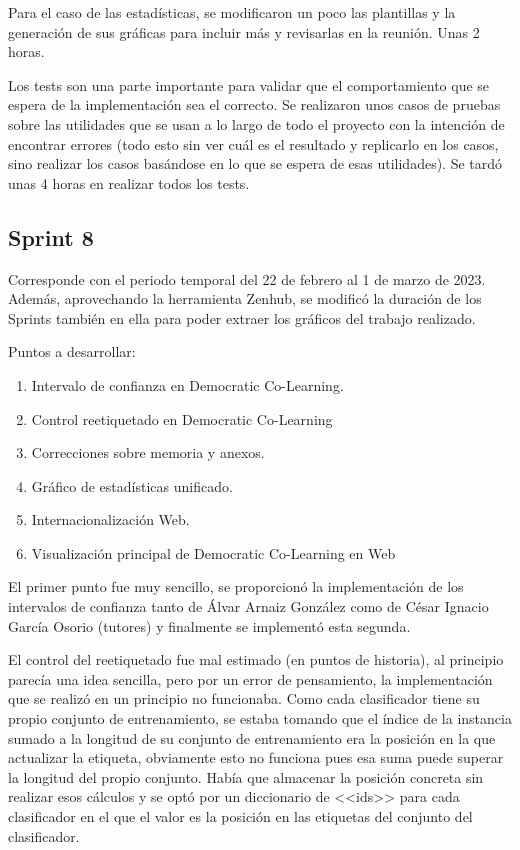 Para el caso de las estadísticas, se modificaron un poco las plantillas y la
generación de sus gráficas para incluir más y revisarlas en la reunión. Unas 2
horas.

Los tests son una parte importante para validar que el comportamiento que se
espera de la implementación sea el correcto. Se realizaron unos casos de pruebas
sobre las utilidades que se usan a lo largo de todo el proyecto con la intención
de encontrar errores (todo esto sin ver cuál es el resultado y replicarlo en los
casos, sino realizar los casos basándose en lo que se espera de esas
utilidades). Se tardó unas 4 horas en realizar todos los tests.

\subsection{Sprint 8}
Corresponde con el periodo temporal del 22 de febrero al 1 de marzo de 2023.
Además, aprovechando la herramienta Zenhub, se modificó la duración de los
Sprints también en ella para poder extraer los gráficos del trabajo realizado.

Puntos a desarrollar:
\begin{enumerate}
    \item Intervalo de confianza en Democratic Co-Learning.
    \item Control reetiquetado en Democratic Co-Learning
    \item Correcciones sobre memoria y anexos.
    \item Gráfico de estadísticas unificado.
    \item Internacionalización Web.
    \item Visualización principal de Democratic Co-Learning en Web
\end{enumerate}

El primer punto fue muy sencillo, se proporcionó la implementación de los
intervalos de confianza tanto de Álvar Arnaiz González como de César Ignacio
García Osorio (tutores) y finalmente se implementó esta segunda.

El control del reetiquetado fue mal estimado (en puntos de historia), al
principio parecía una idea sencilla, pero por un error de pensamiento, la
implementación que se realizó en un principio no funcionaba. Como cada
clasificador tiene su propio conjunto de entrenamiento, se estaba tomando que el
índice de la instancia sumado a la longitud de su conjunto de entrenamiento era
la posición en la que actualizar la etiqueta, obviamente esto no funciona pues
esa suma puede superar la longitud del propio conjunto. Había que almacenar la
posición concreta sin realizar esos cálculos y se optó por un diccionario de
<<ids>> para cada clasificador en el que el valor es la posición en las
etiquetas del conjunto del clasificador.

